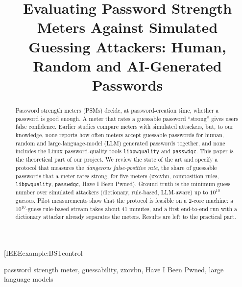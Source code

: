 \documentclass[conference]{IEEEtran}
\makeatletter
\def\bstctlcite{\@ifnextchar[{\@bstctlcite}{\@bstctlcite[@auxout]}}
\def\@bstctlcite[#1]#2{\@bsphack\@for\@citeb:=#2\do{\edef\@citeb{\expandafter\@firstofone\@citeb}\if@filesw\immediate\write\csname #1\endcsname{\string\citation{\@citeb}}\fi}\@esphack}
\makeatother
\begin{document}
\bstctlcite{IEEEexample:BSTcontrol}

\title{Evaluating Password Strength Meters Against Simulated Guessing Attackers: Human, Random and AI-Generated Passwords}

\author{%
}

\maketitle

\begin{abstract}
Password strength meters (PSMs) decide, at password-creation time, whether a password is good enough. A meter that rates a guessable password ``strong'' gives users false confidence. Earlier studies compare meters with simulated attackers, but, to our knowledge, none reports how often meters accept guessable passwords for human, random and large-language-model (LLM) generated passwords together, and none includes the Linux password-quality tools \texttt{libpwquality} and \texttt{passwdqc}. This paper is the theoretical part of our project. We review the state of the art and specify a protocol that measures the \emph{dangerous false-positive rate}, the share of guessable passwords that a meter rates strong, for five meters (zxcvbn, composition rules, \texttt{libpwquality}, \texttt{passwdqc}, Have I Been Pwned). Ground truth is the minimum guess number over simulated attackers (dictionary, rule-based, LLM-aware) up to $10^{10}$ guesses. Pilot measurements show that the protocol is feasible on a 2-core machine: a $10^{10}$-guess rule-based stream takes about 41 minutes, and a first end-to-end run with a dictionary attacker already separates the meters. Results are left to the practical part.
\end{abstract}

\begin{IEEEkeywords}
password strength meter, guessability, zxcvbn, Have I Been Pwned, large language models
\end{IEEEkeywords}

\end{document}
